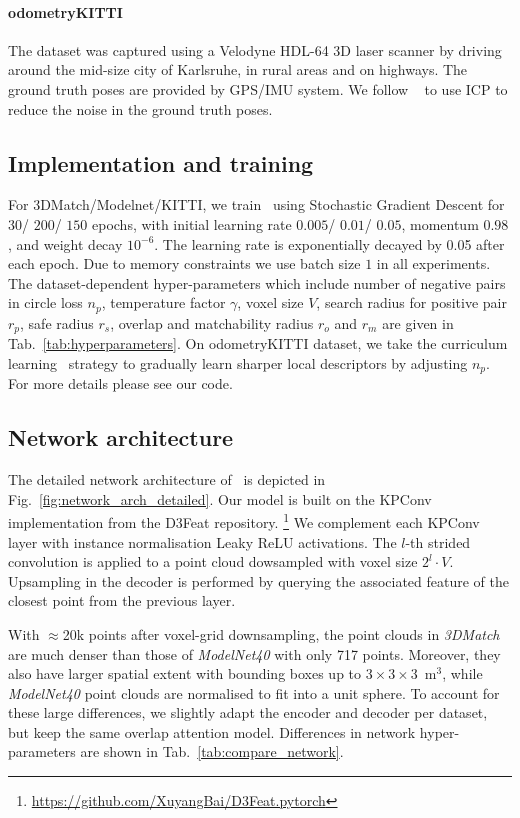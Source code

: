 \paragraph{odometryKITTI}
The dataset was captured using a Velodyne HDL-64 3D laser scanner by driving around the mid-size city of Karlsruhe, in rural areas and on highways. The ground truth poses are provided by GPS/IMU system. We follow ~\cite{bai2020d3feat} to use ICP to reduce the noise in the ground truth poses. 


\subsection{Implementation and training}

\label{sec:training_supp}
For 3DMatch/Modelnet/KITTI, we train \acro\ using Stochastic Gradient Descent for $30$/ $200$/ $150$ epochs, with initial learning rate $0.005$/ $0.01$/ $0.05$, momentum $0.98$, and weight decay $10^{-6}$. The learning rate is exponentially decayed by 0.05 after each epoch. Due to memory constraints we use batch size $1$ in all experiments. The dataset-dependent hyper-parameters which include number of negative pairs in circle loss $n_p$, temperature factor $\gamma$, voxel size $V$, search radius for positive pair $r_p$, safe radius $r_s$, overlap and matchability radius $r_o$ and $r_m$ are given in Tab.~\ref{tab:hyperparameters}. On odometryKITTI dataset, we take the curriculum learning~\cite{bengio2009curriculum} strategy to gradually learn sharper local descriptors by adjusting $n_p$. For more details please see our code.

\subsection{Network architecture}
\label{sec:network_arch_supp}
The detailed network architecture of \acro\ is depicted in Fig.~\ref{fig:network_arch_detailed}. Our model is built on the KPConv implementation from the D3Feat repository.%
\footnote{\url{https://github.com/XuyangBai/D3Feat.pytorch}} %
We complement each KPConv layer with instance normalisation Leaky ReLU activations. The $l$-th strided convolution is applied to a point cloud dowsampled with voxel size $2^{l}\cdot V$. Upsampling in the decoder is performed by querying the associated feature of the closest point from the previous layer.  

With $\approx$20k points after voxel-grid downsampling, the point clouds in \emph{3DMatch}  are much denser than those of \emph{ModelNet40} with only 717 points. Moreover, they also have larger spatial extent with bounding boxes up to $3\times3\times3$~$\text{m}^3$, while \emph{ModelNet40} point clouds are normalised to fit into a unit sphere.
To account for these large differences, we slightly adapt the encoder and decoder per dataset, but keep the same overlap attention model. Differences in network hyper-parameters are shown in Tab.~\ref{tab:compare_network}. 


